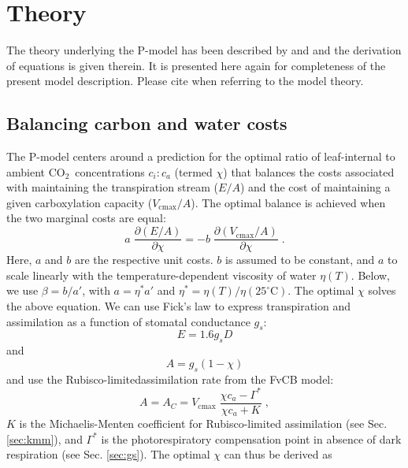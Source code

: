 \documentclass{myreport}
\newcommand{\coo}{CO$_2$}
\begin{document}
\section{Theory}
\label{sec:theory}

The theory underlying the P-model has been described by \cite{prentice14ecollett} and \cite{wang17natpl} and the derivation of equations is given therein. It is presented here again for completeness of the present model description. Please cite \cite{wang17natpl} when referring to the model theory. 

\subsection{Balancing carbon and water costs}
\label{sec:watercarbon}
The P-model centers around a prediction for the optimal ratio of leaf-internal to ambient \coo\ concentrations $c_i:c_a$ (termed $\chi$) that balances the costs associated with maintaining the transpiration stream ($E/A$) and the cost of maintaining a given carboxylation capacity ($V_{\mathrm{cmax}}/A$). The optimal balance is achieved when the two marginal costs are equal: 
\begin{equation}
\label{eq:optimality_chi}
a \; \frac{\partial (E/A)}{\partial \chi} = -b \; \frac{\partial (V_{\mathrm{cmax}}/A)}{\partial \chi}\;.
\end{equation}
Here, $a$ and $b$ are the respective unit costs. $b$ is assumed to be constant, and $a$ to scale linearly with the temperature-dependent viscosity of water $\eta(T)$. Below, we use $\beta = b / a'$, with $a = \eta^\ast a'$ and $\eta^\ast = \eta(T) / \eta(25^{\circ}\text{C})$. The optimal $\chi$ solves the above equation. We can use Fick's law \citep{fick1855} to express transpiration and assimilation as a function of stomatal conductance $g_s$: 
\begin{equation}
\label{eq:egs}
    E = 1.6 g_s D
\end{equation}
and 
\begin{equation}
\label{eq:ags}
    A = g_s (1-\chi)   
\end{equation}
and use the Rubisco-limitedassimilation rate from the FvCB model:
\begin{equation}
\label{eq:ac}
A = A_C = V_{\mathrm{cmax}} \; \frac{\chi c_a-\Gamma^{\ast}}{\chi c_a + K}\; ,
\end{equation}
$K$ is the Michaelis-Menten coefficient for Rubisco-limited assimilation (see Sec. \ref{sec:kmm}), and $\Gamma^{\ast}$ is the photorespiratory compensation point in absence of dark respiration (see Sec. \ref{sec:gs}). The optimal $\chi$ can thus be derived as
\end{document}

